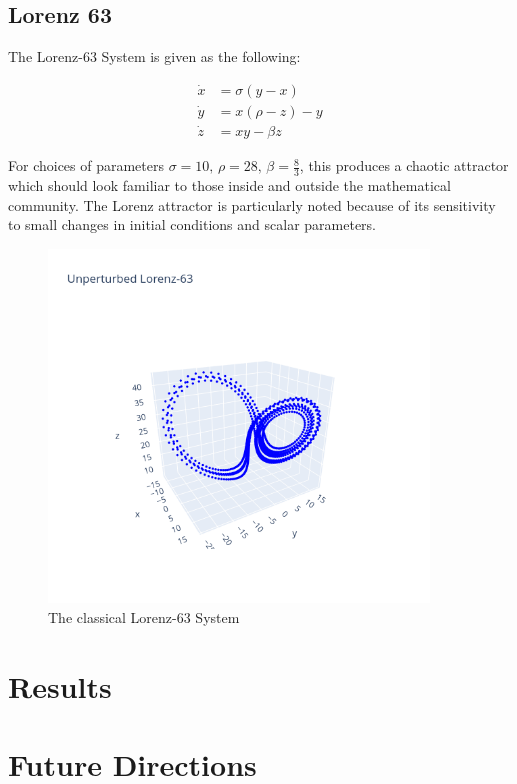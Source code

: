 \documentclass[12pt]{article}
\begin{document}
\subsection{Lorenz 63}

The Lorenz-63 System is given as the following:

\begin{align*}
  \dot{x} &= \sigma (y - x)\\
  \dot{y} &= x ( \rho - z ) - y\\
  \dot{z} &= x y - \beta z
\end{align*}

For choices of parameters $\sigma=10,\, \rho=28,\, \beta=\frac{8}{3}$, this produces a chaotic attractor which should look familiar to those inside and outside the mathematical community. The Lorenz attractor is particularly noted because of its sensitivity to small changes in initial conditions and scalar parameters.

\begin{figure}[ht]
  \centering
  \includegraphics[width=0.9\textwidth]{lorenz-unperturbed.png}
  \caption{The classical Lorenz-63 System}
\end{figure}





\section{Results}


\section{Future Directions}





\nocite{*}

\end{document}
